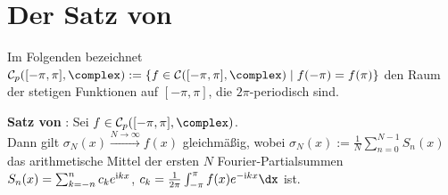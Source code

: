 \pagebreak

\section{%
    Der Satz von %
}

Im Folgenden bezeichnet
$\C_p([-\pi, \pi], \complex) :=
\{f \in \C([-\pi, \pi], \complex) \;|\; f(-\pi) = f(\pi)\}$
den Raum der stetigen Funktionen auf $[-\pi, \pi]$, die $2\pi$-periodisch sind.

\textbf{Satz von }:
Sei $f \in \C_p([-\pi, \pi], \complex)$.\\
Dann gilt $\sigma_N(x) \xrightarrow{N \to \infty} f(x)$ gleichmäßig,
wobei $\sigma_N(x) := \frac{1}{N} \sum_{n=0}^{N-1} S_n(x)$ das arithmetische
Mittel der ersten $N$ Fourier-Partialsummen
$S_n(x) = \sum_{k=-n}^n c_k e^{\mathrm{i} kx}$,
$c_k = \frac{1}{2\pi} \int_{-\pi}^\pi f(x) e^{-\i kx} \dx$ ist.

\linie

